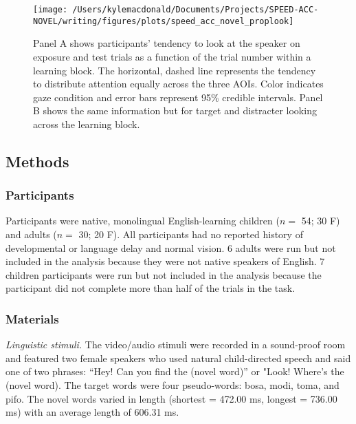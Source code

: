 \documentclass[10pt, letterpaper]{article}
\newenvironment{CodeChunk}{}{}
\begin{document}
\begin{CodeChunk}
\begin{figure*}[t]

{\centering \texttt{[image: /Users/kylemacdonald/Documents/Projects/SPEED-ACC-NOVEL/writing/figures/plots/speed\_acc\_novel\_proplook]} 

}

\caption[Panel A shows participants’ tendency to look at the speaker on exposure and test trials as a function of the trial number within a learning block]{Panel A shows participants’ tendency to look at the speaker on exposure and test trials as a function of the trial number within a learning block. The horizontal, dashed line represents the tendency to distribute attention equally across the three AOIs. Color indicates gaze condition and error bars represent 95\% credible intervals. Panel B shows the same information but for target and distracter looking across the learning block.}\label{fig:san-prop-looking-plot}
\end{figure*}
\end{CodeChunk}

\hypertarget{methods-1}{%
\subsection{Methods}\label{methods-1}}

\hypertarget{participants-1}{%
\subsubsection{Participants}\label{participants-1}}

Participants were native, monolingual English-learning children (\(n=\)
54; 30 F) and adults (\(n=\) 30; 20 F). All participants had no reported
history of developmental or language delay and normal vision. 6 adults
were run but not included in the analysis because they were not native
speakers of English. 7 children participants were run but not included
in the analysis because the participant did not complete more than half
of the trials in the task.

\hypertarget{materials-1}{%
\subsubsection{Materials}\label{materials-1}}

\emph{Linguistic stimuli.} The video/audio stimuli were recorded in a
sound-proof room and featured two female speakers who used natural
child-directed speech and said one of two phrases: ``Hey! Can you find
the (novel word)'' or "Look! Where's the (novel word). The target words
were four pseudo-words: bosa, modi, toma, and pifo. The novel words
varied in length (shortest = 472.00 ms, longest = 736.00 ms) with an
average length of 606.31 ms.
\end{document}
